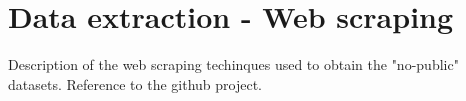 \documentclass{standalone}
\begin{document}
\section[Web Scraping]{Data extraction - Web scraping}\label{scraping}

Description of the web scraping techinques used to obtain the "no-public" datasets.
Reference to the github project.
\end{document}

